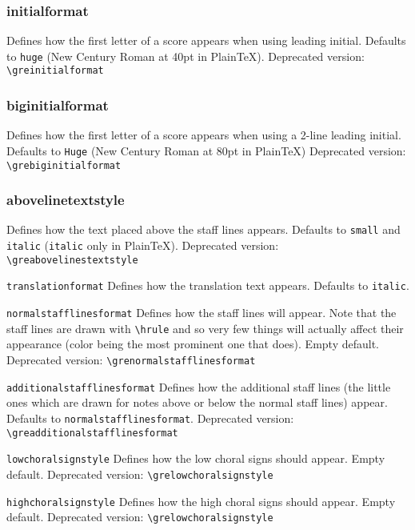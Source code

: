 \subsubsection*{initialformat}
Defines how the first letter of a score appears when using leading
initial.  Defaults to \verb=huge= (New Century Roman at 40pt in
PlainTeX).  Deprecated version: \verb=\greinitialformat=

\subsubsection*{biginitialformat}
Defines how the first letter of a score appears when using a 2-line
leading initial.  Defaults to \verb=Huge= (New Century Roman at 80pt
in PlainTeX) Deprecated version: \verb=\grebiginitialformat=

\subsubsection*{abovelinetextstyle}
Defines how the text placed above the staff lines appears.  Defaults
to \verb=small= and \verb=italic= (\verb=italic= only in PlainTeX).
Deprecated version: \verb=\greabovelinestextstyle=

\verb=translationformat=%
	Defines how the translation text appears.  Defaults to \verb=italic=.

\verb=normalstafflinesformat=%
	Defines how the staff lines will appear.  Note that the staff lines are drawn with \verb=\hrule= and so very few things will actually affect their appearance (color being the most prominent one that does).  Empty default.
	Deprecated version: \verb=\grenormalstafflinesformat=

\verb=additionalstafflinesformat=%
	Defines how the additional staff lines (the little ones which are drawn for notes above or below the normal staff lines) appear.  Defaults to \verb=normalstafflinesformat=.
	Deprecated version: \verb=\greadditionalstafflinesformat=

\verb=lowchoralsignstyle=%
	Defines how the low choral signs should appear.  Empty default.
	Deprecated version: \verb=\grelowchoralsignstyle=

\verb=highchoralsignstyle=%
	Defines how the high choral signs should appear.  Empty default.
	Deprecated version: \verb=\grelowchoralsignstyle=

